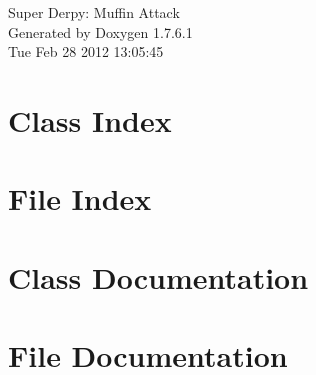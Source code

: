 \documentclass[a4paper]{book}
\begin{document}
\hypersetup{pageanchor=false,citecolor=blue}
\begin{titlepage}
\vspace*{7cm}
\begin{center}
{\Large \-Super \-Derpy\-: \-Muffin \-Attack }\\
\vspace*{1cm}
{\large \-Generated by Doxygen 1.7.6.1}\\
\vspace*{0.5cm}
{\small Tue Feb 28 2012 13:05:45}\\
\end{center}
\end{titlepage}
\clearemptydoublepage
{}
\tableofcontents
\clearemptydoublepage
{}
\hypersetup{pageanchor=true,citecolor=blue}
\chapter{\-Class \-Index}

\chapter{\-File \-Index}

\chapter{\-Class \-Documentation}








\chapter{\-File \-Documentation}
















\printindex
\end{document}
